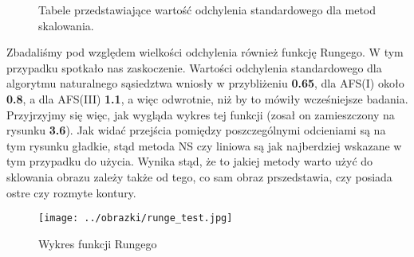 \begin{figure}[h!tb]
\begin{center}
\caption{Tabele przedstawiające wartość odchylenia standardowego dla metod skalowania.}
\end{center}
\end{figure}

Zbadaliśmy pod względem wielkości odchylenia również funkcję Rungego. W tym przypadku spotkało
nas zaskoczenie. Wartości odchylenia standardowego dla algorytmu naturalnego sąsiedztwa wniosły
w przybliżeniu \textbf{0.65}, dla AFS(I) około \textbf{0.8}, a dla AFS(III) \textbf{1.1}, a więc
odwrotnie, niż by to mówiły wcześniejsze badania. Przyjrzyjmy się więc, jak wygląda wykres tej funkcji
(zosał on zamieszczony na rysunku \textbf{3.6}). Jak widać przejścia pomiędzy poszczególnymi odcieniami
są na tym rysunku gładkie, stąd metoda NS czy liniowa są jak najberdziej wskazane w tym przypadku do użycia.
Wynika stąd, że to jakiej metody warto użyć do sklowania obrazu zależy także od tego, co sam obraz prszedstawia,
czy posiada ostre czy rozmyte kontury.
\begin{figure}[h!tb]
\begin{center}
\texttt{[image: ../obrazki/runge\_test.jpg]}
\caption{Wykres funkcji Rungego}
\end{center}
\end{figure}
 





